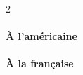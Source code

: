 \documentclass[varwidth, border = 10pt]{standalone}
\begin{document}
\begin{multicols}{2}
  \paragraph{À l'américaine}
  \leavevmode

  \example{(}{)}

  \paragraph{À la française}
  \leavevmode

  \example{]}{[}
\end{multicols}
\end{document}
